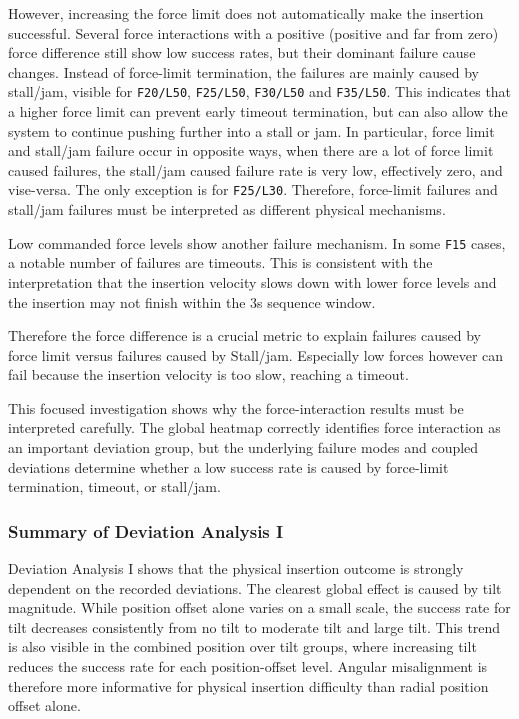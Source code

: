 However, increasing the force limit does not automatically make the insertion successful. Several force interactions with a positive (positive and far from zero) force difference still show low success rates, but their dominant failure cause changes. Instead of force-limit termination, the failures are mainly caused by stall/jam, visible for \texttt{F20/L50}, \texttt{F25/L50}, \texttt{F30/L50} and \texttt{F35/L50}. This indicates that a higher force limit can prevent early timeout termination, but can also allow the system to continue pushing further into a stall or jam. In particular, force limit and stall/jam failure occur in opposite ways, when there are a lot of force limit caused failures, the stall/jam caused failure rate is very low, effectively zero, and vise-versa. The only exception is for \texttt{F25/L30}. Therefore, force-limit failures and stall/jam failures must be interpreted as different physical mechanisms.

Low commanded force levels show another failure mechanism. In some \texttt{F15} cases, a notable number of failures are timeouts. This is consistent with the interpretation that the insertion velocity slows down with lower force levels and the insertion may not finish within the 3s sequence window.

Therefore the force difference is a crucial metric to explain failures caused by force limit versus failures caused by Stall/jam. Especially low forces however can fail because the insertion velocity is too slow, reaching a timeout.

This focused investigation shows why the force-interaction results must be interpreted carefully. The global heatmap correctly identifies force interaction as an important deviation group, but the underlying failure modes and coupled deviations determine whether a low success rate is caused by force-limit termination, timeout, or stall/jam.


\subsubsection{Summary of Deviation Analysis I}
\label{subsubsec:da1_summary}

Deviation Analysis I shows that the physical insertion outcome is strongly dependent on the recorded deviations. The clearest global effect is caused by tilt magnitude. While position offset alone varies on a small scale, the success rate for tilt decreases consistently from no tilt to moderate tilt and large tilt. This trend is also visible in the combined position over tilt groups, where increasing tilt reduces the success rate for each position-offset level. Angular misalignment is therefore more informative for physical insertion difficulty than radial position offset alone.

